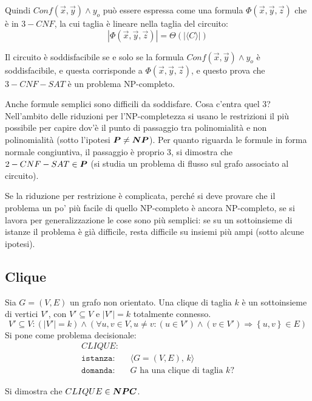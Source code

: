Quindi 
$ Conf \left( \vec{x}, \vec{y} \right) \wedge y_o $
può essere espressa come una formula
$ \Phi \left( \vec{x}, \vec{y}, \vec{z} \right) $
che è in $3-CNF$, la cui taglia è lineare nella taglia del circuito:
\begin{equation*}
    | \Phi \left( \vec{x}, \vec{y}, \vec{z} \right) | = \Theta \left( |\langle C \rangle| \right)
\end{equation*}

Il circuito è soddisfacibile se e solo se la formula 
$ Conf \left( \vec{x}, \vec{y} \right) \wedge y_o $
è soddisfacibile, e questa corrisponde a 
$ \Phi \left( \vec{x}, \vec{y}, \vec{z} \right) $,
e questo prova che $3-CNF-SAT$ è un problema NP-completo.

Anche formule semplici sono difficili da soddisfare. Cosa c'entra quel 3? Nell'ambito delle riduzioni per l'NP-completezza si usano le restrizioni il più possibile per capire dov'è il punto di passaggio tra polinomialità e non polinomialità (sotto l'ipotesi $\bm{P} \ne \bm{NP}$). Per quanto riguarda le formule in forma normale congiuntiva, il passaggio è proprio 3, si dimostra che $2-CNF-SAT \in \bm{P}$ (si studia un problema di flusso sul grafo associato al circuito).

Se la riduzione per restrizione è complicata, perché si deve provare che il problema un po' più facile di quello NP-completo è ancora NP-completo, se si lavora per generalizzazione le cose sono più semplici: se su un sottoinsieme di istanze il problema è già difficile, resta difficile su insiemi più ampi (sotto alcune ipotesi).

\subsection{Clique}

\begin{definition}[Clique]
    \label{def:clique}
    Sia $G=(V,E)$ un grafo non orientato. Una clique di taglia $k$ è un sottoinsieme di vertici $V'$, con $V' \subseteq V$ e $|V'| = k$ totalmente connesso.
    \begin{equation*}
        V' \subseteq V : 
        \left( |V'| = k \right)
        \wedge
        \left( 
            \forall u, v \in V, u \ne v :
            \left( u \in V' \right) \wedge \left( v \in V' \right)
            \Rightarrow
            \left\{ u,v \right\} \in E
        \right)
    \end{equation*}
Si pone come problema decisionale:
\begin{align*}
    CLIQUE: & \\
    \texttt{istanza:} \quad & \langle G=(V,E), \, k \rangle \\
    \texttt{domanda:} \quad & G \text{ ha una clique di taglia } k?
\end{align*}
\end{definition}
Si dimostra che $CLIQUE \in \bm{NPC}$.

